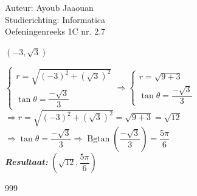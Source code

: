 \documentclass[a4paper]{article}
\begin{document}
  
\noindent \large Auteur: Ayoub Jaaouan          \\
\noindent \large Studierichting: Informatica   \\ 
\noindent \large Oefeningenreeks 1C nr. 2.7   \\

\medskip

\normalsize

$\left(-3, \sqrt{3}\right)$

$\left \{\begin{array}{l} r = \sqrt{(-3)^2+ (\sqrt{3})^2} \\ \tan \theta = \dfrac{-\sqrt{3}}{3} \end{array}\right. 
\Rightarrow \left \{\begin{array}{l} r = \sqrt{9+ 3} \\ \tan \theta = \dfrac{-\sqrt{3}}{3} \end{array}\right.$ \\



$\Rightarrow r = \sqrt{(-3)^2+ (\sqrt{3})^2} = \sqrt{9+ 3} = \sqrt{12}$\\

$\Rightarrow \tan \theta = \dfrac{-\sqrt{3}}{3} \Rightarrow \operatorname{Bgtan}\left(\dfrac{-\sqrt{3}}{3}\right) = \dfrac{5\pi}{6}  $\\



\textit{\textbf{Resultaat:}} $\left(\sqrt{12}, \dfrac{5\pi}{6}\right)$


\begin{thebibliography}{999}
\end{thebibliography}
\end{document}
